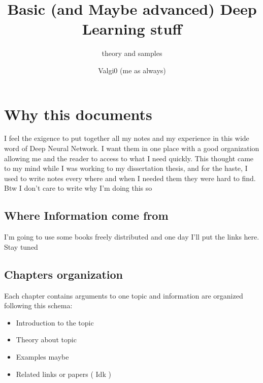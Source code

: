 \documentclass[12pt,a4paper,twoside,openright]{scrbook}
\title{Basic (and Maybe advanced) Deep Learning stuff }
\subtitle{theory and samples}
\author{Valgi0 (me as always)}
\begin{document}
\frontmatter 

\maketitle


\newpage

\tableofcontents

\newpage

\listoffigures

\mainmatter

\pagestyle{fancy} 
\fancyhead[LO]{\nouppercase{\rightmark}}
\fancyhead[RE]{\nouppercase{\leftmark}}
\fancyhead[LE,RO]{\thepage}
\fancyfoot{}

\chapter{Why this documents}
I feel the exigence to put together all my notes and my experience in this wide word of Deep Neural Network. I want them in one place with a good organization allowing me and the reader to access to what I need quickly. This thought came to my mind while I was working to my dissertation thesis, and for the haste, I used to write notes every where and when I needed them they were hard to find. Btw I don't care to write why I'm doing this so

\section{Where Information come from}
I'm going to use some books freely distributed and one day I'll put the links here. Stay tuned

\section{Chapters organization}
Each chapter contains arguments to one topic and information are organized following this schema:
\begin{itemize}
\item Introduction to the topic
\item Theory about topic
\item Examples maybe
\item Related links or papers ( Idk )
\end{itemize}
\end{document}

